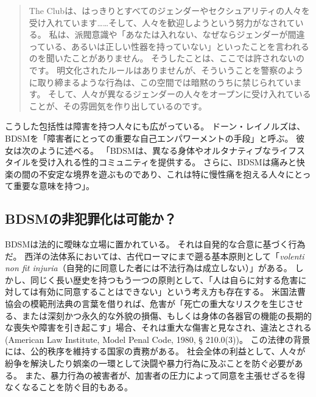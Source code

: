 \documentclass[paper=a4,book,openany]{jlreq}
\begin{document}
\begin{quote}
 The Clubは、はっきりとすべてのジェンダーやセクシュアリティの人々を受け入れています……そして、人々を歓迎しようという努力がなされている。
私は、派閥意識や「あなたは入れない、なぜならジェンダーが間違っている、あるいは正しい性器を持っていない」といったことを言われるのを聞いたことがありません。
そうしたことは、ここでは許されないのです。
明文化されたルールはありませんが、そういうことを警察のように取り締まるような行為は、この空間では暗黙のうちに禁じられています。
そして、人々が異なるジェンダーの人々をオープンに受け入れていることが、その雰囲気を作り出しているのです。
\citep[p.1653]{stone13:_flexib_queer_serious_bodies}
\end{quote}

こうした包括性は障害を持つ人々にも広がっている。
ドーン・レイノルズは、BDSMを「障害者にとっての重要な自己エンパワーメントの手段」と呼ぶ。
彼女は次のように述べる。
「BDSMは、異なる身体やオルタナティブなライフスタイルを受け入れる性的コミュニティを提供する。
さらに、BDSMは痛みと快楽の間の不安定な境界を遊ぶものであり、これは特に慢性痛を抱える人々にとって重要な意味を持つ」\citep{reynolds07:_disab_bdsm}。

\subsection{BDSMの非犯罪化は可能か？}

BDSMは法的に曖昧な立場に置かれている。
それは自発的な合意に基づく行為だ。
西洋の法体系においては、古代ローマにまで遡る基本原則として「\emph{volenti non fit injuria}（自発的に同意した者には不法行為は成立しない）」がある。
しかし、同じく長い歴史を持つもう一つの原則として、「人は自らに対する危害に対しては有効に同意することはできない」という考え方も存在する。
米国法曹協会の模範刑法典の言葉を借りれば、危害が「死亡の重大なリスクを生じさせる、または深刻かつ永久的な外貌の損傷、もしくは身体の各器官の機能の長期的な喪失や障害を引き起こす」場合、それは重大な傷害と見なされ、違法とされる(American Law Institute, Model Penal Code, 1980, § 210.0(3))。
この法律の背景には、公的秩序を維持する国家の責務がある。
社会全体の利益として、人々が紛争を解決したり娯楽の一環として決闘や暴力行為に及ぶことを防ぐ必要がある。
また、暴力行為の被害者が、加害者の圧力によって同意を主張せざるを得なくなることを防ぐ目的もある。
\end{document}
